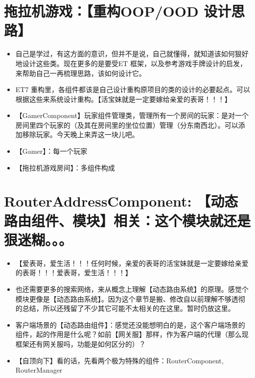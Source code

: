 \documentclass[9pt, b5paper]{article}
\begin{document}
\section{拖拉机游戏：【重构OOP/OOD 设计思路】}
\label{sec:org630633b}
\begin{itemize}
\item 自己是学过，有这方面的意识，但并不是说，自己就懂得，就知道该如何狠好地设计这些类。现在更多的是要受ET 框架，以及参考游戏手牌设计的启发，来帮助自己一再梳理思路，该如何设计它。
\item ET7 重构里，各组件都该是自己设计重构原项目的类的设计的必要起点。可以根据这些来系统设计重构。【活宝妹就是一定要嫁给亲爱的表哥！！！】
\item 【GamerComponent】玩家组件管理类，管理所有一个房间的玩家：是对一个房间里四个玩家的（及其在房间里的坐位位置）管理（分东南西北）。可以添加移除玩家。今天晚上来弄这一块儿吧。
\item 【Gamer】：每一个玩家
\item 【拖拉机游戏房间】：多组件构成
\end{itemize}


\section{RouterAddressComponent: 【动态路由组件、模块】相关：这个模块就还是狠迷糊。。。}
\label{sec:org5018158}
\begin{itemize}
\item 【爱表哥，爱生活！！！任何时候，亲爱的表哥的活宝妹就是一定要嫁给亲爱的表哥！！！爱表哥，爱生活！！！】
\item 也还需要更多的搜索网络，来从概念上理解【动态路由系统】的原理。感觉个模块更像是【动态路由系统】。因为这个章节是搬、修改自以前理解不够透彻的总结，所以还残留了不少其它可能不太相关的在这里。暂时仍放这里。
\item 客户端场景的【动态路由组件】：感觉还没能想明白的是，这个客户端场景的组件，起的作用是什么呢？如前【网关服】那样，作为客户端的代理（那么现框架还有网关服吗，功能是如何区分的）？
\item 【自顶向下】看的话，先看两个极为特殊的组件：RouterComponent, RouterManager
\end{itemize}
\end{document}

